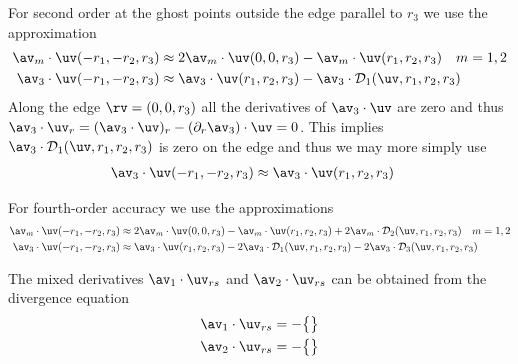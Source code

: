 \documentclass[10pt]{article}
\newcommand{\Ds}{{\mathcal D}}%
\newcommand{\ra}{{r_1}}%
\newcommand{\rb}{{r_2}}%
\newcommand{\rc}{{r_3}}%
\begin{document}

For second order at the ghost points outside the edge parallel to $\rc$ we use the approximation
\begin{align}
   \av_m\cdot\uv(-\ra,-\rb,\rc) &\approx 2 \av_m\cdot\uv(0,0,\rc) - \av_m\cdot\uv(\ra,\rb,\rc)  \quad m=1,2 \\
   \av_3\cdot\uv(-\ra,-\rb,\rc) &\approx \av_3\cdot\uv(\ra,\rb,\rc) - \av_3\cdot\Ds_1(\uv,\ra,\rb,\rc) 
\end{align}
Along the edge $\rv=(0,0,\rc)$ all the derivatives of $\av_3\cdot\uv$ are zero and thus
$\av_3\cdot\uv_r = (\av_3\cdot\uv)_r - (\partial_r\av_3)\cdot\uv = 0 $.
This implies $\av_3\cdot\Ds_1(\uv,\ra,\rb,\rc)$ is zero on the edge and thus 
we may more simply use
\begin{align}
   \av_3\cdot\uv(-\ra,-\rb,\rc) &\approx \av_3\cdot\uv(\ra,\rb,\rc) 
\end{align}

For fourth-order accuracy  we use the approximations
\begin{align}
  \av_m\cdot\uv(-\ra,-\rb,\rc) &\approx 2 \av_m\cdot\uv(0,0,\rc) - \av_m\cdot\uv(\ra,\rb,\rc) 
                          + 2\av_m\cdot\Ds_2(\uv,\ra,\rb,\rc) \quad m=1,2 \\
  \av_3\cdot\uv(-\ra,-\rb,\rc) &\approx \av_3\cdot\uv(\ra,\rb,\rc) - 2\av_3\cdot\Ds_1(\uv,\ra,\rb,\rc) 
                     - 2\av_3\cdot\Ds_3(\uv,\ra,\rb,\rc) 
\end{align}


The mixed derivatives $\av_1\cdot\uv_{rs}$ and $\av_2\cdot\uv_{rs}$ can be obtained from the
divergence equation
\begin{align}
  \av_1\cdot\uv_{rs} &= -\big\{ \big\} \\
  \av_2\cdot\uv_{rs} &= -\big\{ \big\} 
\end{align}
\end{document}
